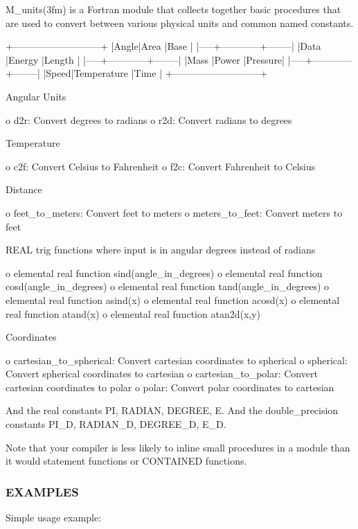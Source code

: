 \begin{DoxyVerb}M_units(3fm) is a Fortran module that collects together basic
procedures that are used to convert between various physical units
and common named constants.

   +---------------------------+
   |Angle|Area        |Base    |
   |-----+------------+--------|
   |Data |Energy      |Length  |
   |-----+------------+--------|
   |Mass |Power       |Pressure|
   |-----+------------+--------|
   |Speed|Temperature |Time    |
   +---------------------------+

Angular Units

 o d2r:  Convert degrees to radians
 o r2d:  Convert radians to degrees

Temperature

 o c2f:  Convert Celsius to Fahrenheit
 o f2c:  Convert Fahrenheit to Celsius

Distance

 o feet_to_meters:  Convert feet to meters
 o meters_to_feet:  Convert meters to feet

REAL trig functions where input is in angular degrees instead of radians

 o elemental real function sind(angle_in_degrees)
 o elemental real function cosd(angle_in_degrees)
 o elemental real function tand(angle_in_degrees)
 o elemental real function asind(x)
 o elemental real function acosd(x)
 o elemental real function atand(x)
 o elemental real function atan2d(x,y)

Coordinates

 o cartesian_to_spherical:  Convert cartesian coordinates to spherical
 o spherical:  Convert spherical coordinates to cartesian
 o cartesian_to_polar:  Convert cartesian coordinates to polar
 o polar:  Convert polar coordinates to cartesian
\end{DoxyVerb}


And the real constants PI, R\+A\+D\+I\+AN, D\+E\+G\+R\+EE, E. And the double\+\_\+precision constants P\+I\+\_\+D, R\+A\+D\+I\+A\+N\+\_\+D, D\+E\+G\+R\+E\+E\+\_\+D, E\+\_\+D.

Note that your compiler is less likely to inline small procedures in a module than it would statement functions or C\+O\+N\+T\+A\+I\+N\+ED functions.

\subsubsection*{E\+X\+A\+M\+P\+L\+ES}

Simple usage example\+:


